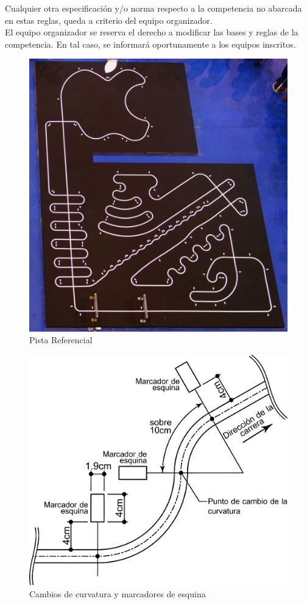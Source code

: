\vspace{15mm}
Cualquier otra especificación y/o norma respecto a la competencia no abarcada en estas reglas, queda a criterio del equipo organizador. \\

El equipo organizador se reserva el derecho a modificar las bases y reglas de la competencia. En tal caso, se informará oportunamente a los equipos inscritos.

\begin{figure}[H]
  \centering
  \includegraphics[width=\linewidth]{./images/rules/figure1.png}
  \caption{Pista Referencial}
\end{figure}

\begin{figure}[H]
  \centering
  \includegraphics[width=0.6\linewidth]{./images/rules/figure2.png}
  \caption{Cambios de curvatura y marcadores de esquina}
\end{figure}

